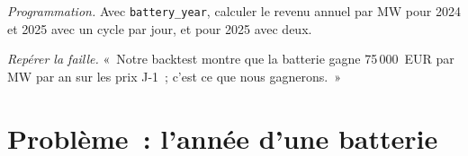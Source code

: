\begin{exercise}[$\star\star\star$]\label{exo:m3:power-markets-trading:7}
\emph{Programmation.} Avec \texttt{battery\_year}, calculer le revenu annuel par MW pour 2024 et 2025 avec
un cycle par jour, et pour 2025 avec deux.
\end{exercise}

\begin{exercise}[$\star\star\star$]\label{exo:m3:power-markets-trading:8}
\emph{Repérer la faille.} «~Notre backtest montre que la batterie gagne 75\,000~EUR par MW par an sur
les prix J-1~; c'est ce que nous gagnerons.~»
\end{exercise}

\section{Problème~: l'année d'une batterie}

